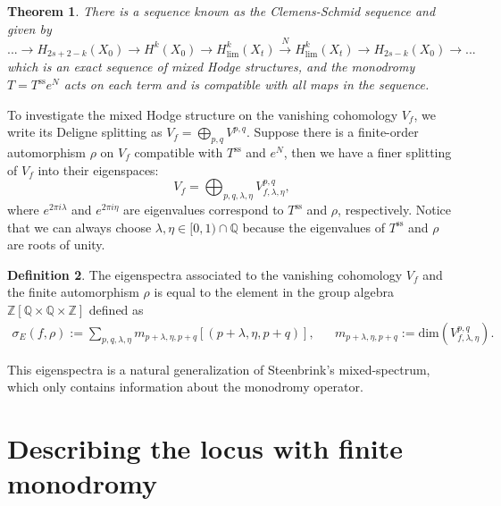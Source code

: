 \documentclass[12pt, letterpaper]{amsart}
\theoremstyle{plain}
\newtheorem{theorem}{Theorem}[section]
\theoremstyle{definition}
\newtheorem{definition}[theorem]{Definition}
\begin{document}
\begin{theorem}\label{css}
There is a sequence known as the Clemens-Schmid sequence and given by 
\begin{equation}
    ...\rightarrow H_{2s+2-k}(X_0)\rightarrow H^k(X_0)\xrightarrow{\mathrm{}}{}H^k_{\mathrm{lim}}(X_t)\xrightarrow{N}H^k_{\mathrm{lim}}(X_t) \xrightarrow{}H_{2s-k}(X_0)\rightarrow ...
\end{equation}
which is an exact sequence of mixed Hodge structures, and the monodromy $T=T^{\text{ss}}e^N$ acts on each term and is compatible with all maps in the sequence.
\end{theorem}
To investigate the mixed Hodge structure on the vanishing cohomology $V_f$, we write its Deligne splitting as $V_f=\bigoplus_{p,q}V^{p,q}$.
Suppose there is a finite-order automorphism $\rho$ on $V_f$ compatible with $T^{\text{ss}}$ and $e^N$, then we have a finer splitting of $V_f$ into their eigenspaces:
\begin{equation}
    V_f=\bigoplus_{p,q, \lambda, \eta}V_{f,\lambda, \eta}^{p,q},
\end{equation}
where $e^{2\pi i\lambda}$ and $e^{2\pi i\eta}$
are eigenvalues correspond to 
$T^{\text{ss}}$ and $\rho$, respectively. Notice that we can always choose $\lambda,\eta\in [0,1)\cap \mathbb{Q}$ because the eigenvalues of $T^{\text{ss}}$ and $\rho$ are roots of unity.

\begin{definition}\label{defn:Eigenspectra}
The eigenspectra associated to the vanishing cohomology $V_f$ and the finite automorphism $\rho$ is equal to 
the element in the group algebra $\mathbb{Z}[\mathbb{Q}\times \mathbb{Q}\times \mathbb{Z}]$ defined as
\begin{align*}
    {\sigma_E(f, \rho)}:= \sum_{p,q,\lambda, \eta}m_{p+\lambda, \eta, p+q}[(p+\lambda,\eta,  p+q)],
    &&
    m_{p+\lambda,\eta, p+q}:=\textrm{dim}(V_{f,\lambda, \eta}^{p,q}).
\end{align*}
\end{definition}
This eigenspectra is a natural generalization of Steenbrink's mixed-spectrum, which only contains information about the monodromy operator. 

\section{
Describing the locus with finite monodromy}
\label{sec:PureLocus}
\end{document}

